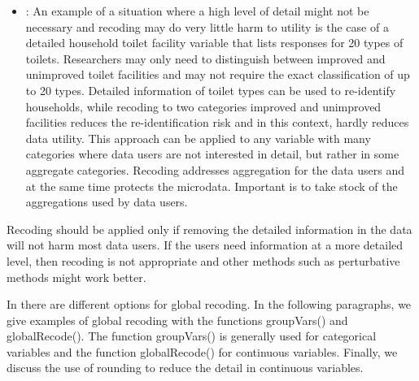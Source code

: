 \documentclass[letterpaper,10pt,english]{sphinxmanual}
\begin{document}
\begin{itemize}
\item {} 
: An example of a situation where a high level of
detail might not be necessary and recoding may do very little harm to
utility is the case of a detailed household toilet facility variable
that lists responses for 20 types of toilets. Researchers may only
need to distinguish between improved and unimproved toilet facilities
and may not require the exact classification of up to 20 types.
Detailed information of toilet types can be used to re-identify
households, while recoding to two categories \textendash{} improved and
unimproved facilities \textendash{} reduces the re-identification risk and in
this context, hardly reduces data utility. This approach can be
applied to any variable with many categories where data users are not
interested in detail, but rather in some aggregate categories.
Recoding addresses aggregation for the data users and at the same
time protects the microdata. Important is to take stock of the
aggregations used by data users.

\end{itemize}

Recoding should be applied only if removing the detailed information in
the data will not harm most data users. If the users need information at
a more detailed level, then recoding is not appropriate and other
methods such as perturbative methods might work better.

In  there are different options for global recoding. In the
following paragraphs, we give examples of global recoding with the
functions groupVars() and globalRecode(). The function groupVars() is
generally used for categorical variables and the function globalRecode()
for continuous variables. Finally, we discuss the use of rounding to
reduce the detail in continuous variables.
\end{document}
